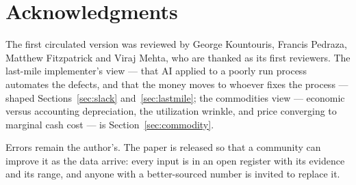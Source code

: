 \documentclass[11pt,letterpaper]{article}
\begin{document}
\section*{Acknowledgments}
The first circulated version was reviewed by George Kountouris, Francis Pedraza, Matthew Fitzpatrick and Viraj Mehta, who are thanked as its first reviewers. The last-mile implementer's view --- that AI applied to a poorly run process automates the defects, and that the money moves to whoever fixes the process --- shaped Sections~\ref{sec:slack} and~\ref{sec:lastmile}; the commodities view --- economic versus accounting depreciation, the utilization wrinkle, and price converging to marginal cash cost --- is Section~\ref{sec:commodity}.

Errors remain the author's. The paper is released so that a community can improve it as the data arrive: every input is in an open register with its evidence and its range, and anyone with a better-sourced number is invited to replace it.

\newpage
\appendix
\end{document}
